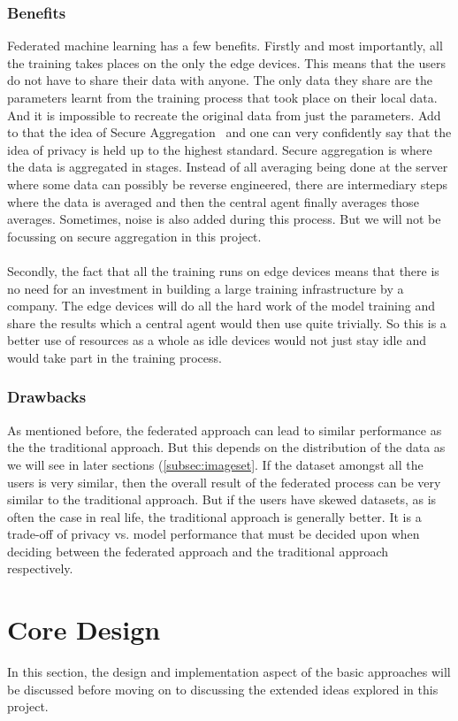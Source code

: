 \documentclass[12pt]{article}
\begin{document}
\subsubsection{Benefits}
Federated machine learning has a few benefits. Firstly and most importantly, all the training takes places on the only the edge devices. This means that the users do not have to share their data with anyone. The only data they share are the parameters learnt from the training process that took place on their local data. And it is impossible to recreate the original data from just the parameters. Add to that the idea of Secure Aggregation~\cite{secagg} and one can very confidently say that the idea of privacy is held up to the highest standard. Secure aggregation is where the data is aggregated in stages. Instead of all averaging being done at the server where some data can possibly be reverse engineered, there are intermediary steps where the data is averaged and then the central agent finally averages those averages. Sometimes, noise is also added during this process. But we will not be focussing on secure aggregation in this project. 
\\\\
Secondly, the fact that all the training runs on edge devices means that there is no need for an investment in building a large training infrastructure by a company. The edge devices will do all the hard work of the model training and share the results which a central agent would then use quite trivially. So this is a better use of resources as a whole as idle devices would not just stay idle and would take part in the training process.
\subsubsection{Drawbacks}
As mentioned before, the federated approach can lead to similar performance as the the traditional approach. But this depends on the distribution of the data as we will see in later sections (\ref{subsec:imageset}. If the dataset amongst all the users is very similar, then the overall result of the federated process can be very similar to the traditional approach. But if the users have skewed datasets, as is often the case in real life, the traditional approach is generally better. It is a trade-off of privacy vs. model performance that must be decided upon when deciding between the federated approach and the traditional approach respectively.
\clearpage

\section{Core Design}
In this section, the design and implementation aspect of the basic approaches will be discussed before moving on to discussing the extended ideas explored in this project. 
\end{document}
